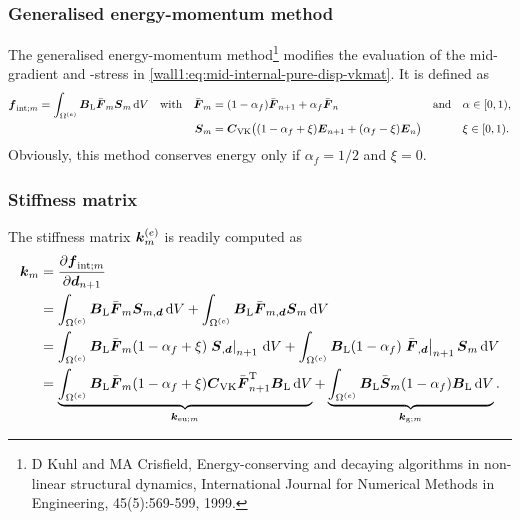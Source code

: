 \subsubsection{Generalised energy-momentum method}
The generalised energy-momentum method\footnote{D Kuhl and MA Crisfield,
Energy-conserving and decaying algorithms in non-linear structural dynamics,
International Journal for Numerical Methods in Engineering, 45(5):569-599,
1999.} modifies the evaluation of the mid-gradient and -stress in
\eqref{wall1:eq:mid-internal-pure-disp-vkmat}. It is defined as
\begin{equation}
\begin{aligned}
   \boldsymbol{f}_{\text{int};m}
&  = \int_{\Omega^{(e)}}
     \boldsymbol{B}_{\text{L}}
     {\bar{\boldsymbol{F}}_m}
     {\boldsymbol{S}_m}
     \, \mathrm{d} V
&& \text{with}
&  \bar{\boldsymbol{F}}_m
&  = (1-\alpha_f) \bar{\boldsymbol{F}}_{n+1} + \alpha_f \bar{\boldsymbol{F}}_n
&& \text{and}
&&  \alpha\in[0,1)
   \text{,}
\\
&
&&
&  \boldsymbol{S}_m
&  = \boldsymbol{C}_{\text{VK}} \big( (1-\alpha_f+\xi)\boldsymbol{E}_{n+1} +
(\alpha_f-\xi)\boldsymbol{E}_{n} \big)
&&
&& \xi\in[0,1)
   \text{.}
\end{aligned}
\end{equation}
Obviously, this method conserves energy only if $\alpha_f=1/2$ and $\xi=0$.
  

\subsubsection{Stiffness matrix}
The stiffness matrix $\boldsymbol{k}^{(e)}_m$ is readily computed as
\begin{equation}
\begin{aligned}
   \boldsymbol{k}_m
&  = \frac{\partial \boldsymbol{f}_{\text{int};m}}{\partial \boldsymbol{d}_{n+1}}
\\
&  = \int_{\Omega^{(e)}}
   \boldsymbol{B}_{\text{L}} \bar{\boldsymbol{F}}_m \boldsymbol{S}_{m,\boldsymbol{d}}
   \, \mathrm{d} V
   + \int_{\Omega^{(e)}}
   \boldsymbol{B}_{\text{L}} \bar{\boldsymbol{F}}_{m,\boldsymbol{d}} \boldsymbol{S}_{m}
   \, \mathrm{d} V
\\
&  = \int_{\Omega^{(e)}}
   \boldsymbol{B}_{\text{L}} \bar{\boldsymbol{F}}_m (1-\alpha_f+\xi)\left.\boldsymbol{S}_{,\boldsymbol{d}}\right|_{n+1}
   \, \mathrm{d} V
   + \int_{\Omega^{(e)}}
   \boldsymbol{B}_{\text{L}} (1-\alpha_f)\left.\bar{\boldsymbol{F}}_{,\boldsymbol{d}}\right|_{n+1} \boldsymbol{S}_{m}
   \, \mathrm{d} V
\\
&  = \underbrace{\int_{\Omega^{(e)}}
   \boldsymbol{B}_{\text{L}} \bar{\boldsymbol{F}}_m (1-\alpha_f+\xi) \boldsymbol{C}_{\text{VK}} \bar{\boldsymbol{F}}_{n+1}^{\mathrm{T}} \boldsymbol{B}_{\text{L}}
   \, \mathrm{d} V}_{\boldsymbol{k}_{\text{e}\text{u};m}}
   + \underbrace{\int_{\Omega^{(e)}}
   \boldsymbol{B}_{\text{L}} \bar{\boldsymbol{S}}_{m} (1-\alpha_f)\boldsymbol{B}_{\text{L}}
   \, \mathrm{d} V}_{\boldsymbol{k}_{\text{g};m}}
   \text{.}
\end{aligned}
\end{equation}

